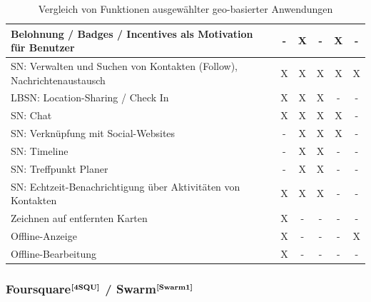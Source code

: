 \begin{table}[H]
\begin{adjustwidth}{-1.15cm}{1.15cm}
\begin{tabulary}{17cm}{|L|C|C|C|C|C|}
Belohnung / Badges / Incentives als Motivation für Benutzer
\endgroup
			& - & X & - & X & - \\ \hline
\begingroup
	\fontsize{9pt}{11pt}\selectfont
SN: Verwalten und Suchen von Kontakten (Follow), Nachrichtenaustausch
\endgroup
			& X & X & X & X & X \\ \hline
\begingroup
	\fontsize{9pt}{11pt}\selectfont
LBSN: Location-Sharing / Check In
\endgroup
			& X & X & X & - & - \\ \hline
\begingroup
	\fontsize{9pt}{11pt}\selectfont
SN: Chat
\endgroup
			& X & X & X & X & - \\ \hline
\begingroup
	\fontsize{9pt}{11pt}\selectfont
SN: Verknüpfung mit Social-Websites
\endgroup
			& - & X & X & X & - \\ \hline
\begingroup
	\fontsize{9pt}{11pt}\selectfont
SN: Timeline
\endgroup
			& - & X & X & - & - \\ \hline
\begingroup
	\fontsize{9pt}{11pt}\selectfont
SN: Treffpunkt Planer
\endgroup
			& - & X & X & - & - \\ \hline
\begingroup
	\fontsize{9pt}{11pt}\selectfont
SN: Echtzeit-Benachrichtigung über Aktivitäten von Kontakten
\endgroup
			& X & X & X & - & - \\ \hline
\begingroup
	\fontsize{9pt}{11pt}\selectfont
Zeichnen auf entfernten Karten
\endgroup
			& X & - & - & - & - \\ \hline
\begingroup
	\fontsize{9pt}{11pt}\selectfont
Offline-Anzeige
\endgroup
			& X & - & - & - & X \\ \hline
\begingroup
	\fontsize{9pt}{11pt}\selectfont
Offline-Bearbeitung
\endgroup
			& X & - & - & - & - \\ \hline
		\end{tabulary}
	\caption{Vergleich von Funktionen ausgewählter geo-basierter Anwendungen}
	\end{adjustwidth}
	\end{table}

\subsubsection{Foursquare$^{\textbf{\ref{4SQU}}}$ / Swarm$^{\textbf{\ref{Swarm1}}}$}
